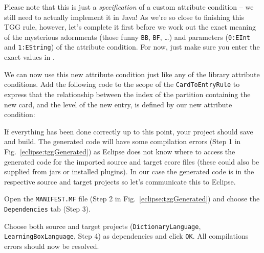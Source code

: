 \begin{stepbystep}
\item Please note that this is just a \emph{specification} of a custom attribute condition -- we still need to actually implement it in Java! 
As we're so close to finishing this TGG rule, however, let's complete it first before we work out the exact meaning of the mysterious adornments (those funny \texttt{BB}, \texttt{BF}, \dots) and parameters (\texttt{0:EInt} and \texttt{1:EString}) of the attribute condition. 
For now, just make sure you enter the exact values in . 

\item We can now use this new attribute condition  just like any of the library attribute conditions.
Add the following code to the  scope of the \texttt{CardToEntryRule} to express that the relationship between the index of the partition containing the new card, and the level of the new entry, is defined by our new attribute condition:

\end{stepbystep}

If everything has been done correctly up to this point, your project should save and build.
The generated code will have some compilation errors (Step 1 in Fig.~\ref{eclipse:tggGenerated}) as Eclipse does not know where to access the generated code for the imported source and target ecore files (these could also be supplied from jars or installed plugins).
In our case the generated code is in the respective source and target projects so let's communicate this to Eclipse.

\begin{stepbystep}

\item Open the \texttt{MANIFEST.MF} file (Step 2 in Fig.~\ref{eclipse:tggGenerated}) and choose the \texttt{De\-pen\-den\-cies} tab (Step 3).

\item Choose both source and target projects (\texttt{DictionaryLanguage}, \texttt{Learning\-Box\-Language}, Step 4) as dependencies and click \texttt{OK}.
All compilations errors should now be resolved.
\end{stepbystep}

